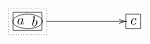 \documentclass[nofonts]{ctexart}
\begin{document}
\[
	\xymatrix@=2cm{
		*+[F.]{\composite{*+[o][F]{a\quad} * *+[F]{\quad b}}} \ar[r]
		& *+[F]{c}
	}
\]
\end{document}
